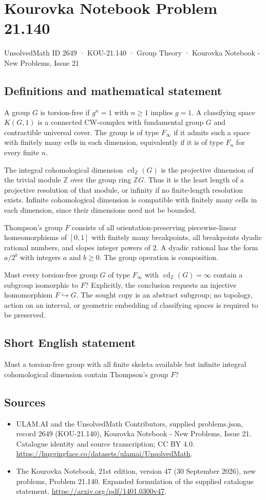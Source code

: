 \documentclass[11pt,a4paper]{article}
\begin{document}
\section*{Kourovka Notebook Problem 21.140}\label{2649}
{\small UnsolvedMath ID 2649 · KOU-21.140 · Group Theory · Kourovka Notebook - New Problems, Issue 21}
\subsection{Definitions and mathematical statement}
A group $G$ is torsion-free if $g^n=1$ with $n\ge1$ implies $g=1$. A classifying space $K(G,1)$ is a connected CW-complex with fundamental group $G$ and contractible universal cover. The group is of type $F_\infty$ if it admits such a space with finitely many cells in each dimension, equivalently if it is of type $F_n$ for every finite $n$.

The integral cohomological dimension $\operatorname{cd}_{\mathbb Z}(G)$ is the projective dimension of the trivial module $\mathbb Z$ over the group ring $\mathbb ZG$. Thus it is the least length of a projective resolution of that module, or infinity if no finite-length resolution exists. Infinite cohomological dimension is compatible with finitely many cells in each dimension, since their dimensions need not be bounded.

Thompson's group $F$ consists of all orientation-preserving piecewise-linear homeomorphisms of $[0,1]$ with finitely many breakpoints, all breakpoints dyadic rational numbers, and slopes integer powers of $2$. A dyadic rational has the form $a/2^b$ with integers $a$ and $b\ge0$. The group operation is composition.

Must every torsion-free group $G$ of type $F_\infty$ with $\operatorname{cd}_{\mathbb Z}(G)=\infty$ contain a subgroup isomorphic to $F$? Explicitly, the conclusion requests an injective homomorphism $F\hookrightarrow G$. The sought copy is an abstract subgroup; no topology, action on an interval, or geometric embedding of classifying spaces is required to be preserved.
\subsection{Short English statement}
Must a torsion-free group with all finite skeleta available but infinite integral cohomological dimension contain Thompson’s group $F$?
\subsection{Sources}
\begin{itemize}
\item[S1] ULAM.AI and the UnsolvedMath Contributors, supplied problems.json, record 2649 (KOU-21.140), Kourovka Notebook - New Problems, Issue 21. Catalogue identity and source transcription; CC BY 4.0.
\url{https://huggingface.co/datasets/ulamai/UnsolvedMath}.
\item[S2] The Kourovka Notebook, 21st edition, version 47 (30 September 2026), new problems, Problem 21.140. Expanded formulation of the supplied catalogue statement.
\url{https://arxiv.org/pdf/1401.0300v47}.
\end{itemize}
\end{document}
